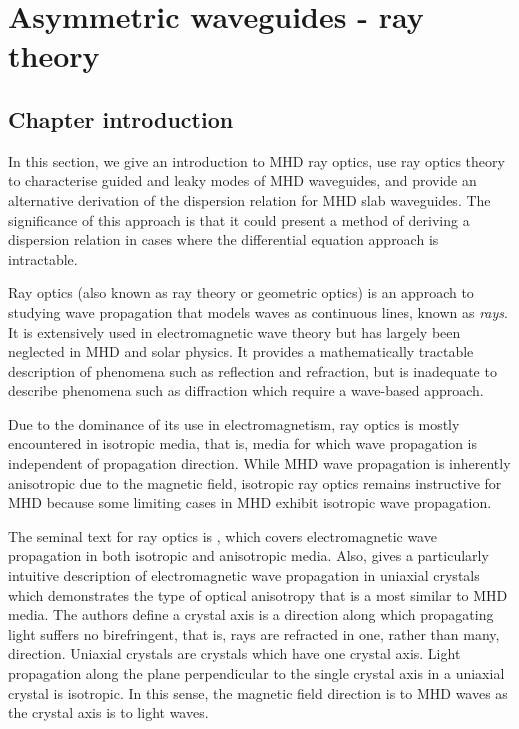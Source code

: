 
\chapter{Asymmetric waveguides - ray theory}
\label{chap: ray}

\section{Chapter introduction}
\label{sec: ray intro}

	In this section, we give an introduction to MHD ray optics, use ray optics theory to characterise guided and leaky modes of MHD waveguides, and provide an alternative derivation of the dispersion relation for MHD slab waveguides. The significance of this approach is that it could present a method of deriving a dispersion relation in cases where the differential equation approach is intractable.
	
	Ray optics (also known as ray theory or geometric optics) is an approach to studying wave propagation that models waves as continuous lines, known as \textit{rays}. It is extensively used in electromagnetic wave theory but has largely been neglected in MHD and solar physics. It provides a mathematically tractable description of phenomena such as reflection and refraction, but is inadequate to describe phenomena such as diffraction which require a wave-based approach.
	
	Due to the dominance of its use in electromagnetism, ray optics is mostly encountered in isotropic media, that is, media for which wave propagation is independent of propagation direction. While MHD wave propagation is inherently anisotropic due to the magnetic field, isotropic ray optics remains instructive for MHD because some limiting cases in MHD exhibit isotropic wave propagation.
	
	The seminal text for ray optics is \cite{bor_etal99}, which covers electromagnetic wave propagation in both isotropic and anisotropic media. Also, \cite{vei_etal10} gives a particularly intuitive description of electromagnetic wave propagation in uniaxial crystals which demonstrates the type of optical anisotropy that is a most similar to MHD media. The authors define a crystal axis is a direction along which propagating light suffers no birefringent, that is, rays are refracted in one, rather than many, direction. Uniaxial crystals are crystals which have one crystal axis. Light propagation along the plane perpendicular to the single crystal axis in a uniaxial crystal is isotropic. In this sense, the magnetic field direction is to MHD waves as the crystal axis is to light waves. 
	
